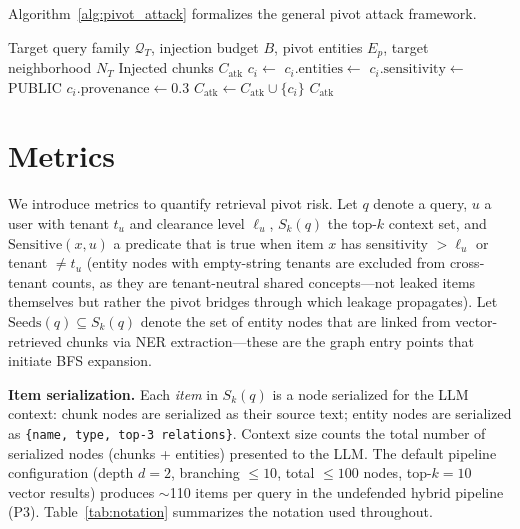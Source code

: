 \documentclass[letterpaper,twocolumn,10pt]{article}
\begin{document}
\medskip

Algorithm~\ref{alg:pivot_attack} formalizes the general pivot attack
framework.

\begin{algorithm}[t]
\caption{General Retrieval Pivot Attack}
\label{alg:pivot_attack}
\begin{algorithmic}[1]
\Require Target query family $\mathcal{Q}_T$, injection budget $B$,
  pivot entities $E_p$, target neighborhood $N_T$
\Ensure Injected chunks $C_\text{atk}$
  \State $c_i \leftarrow$ 
  \State $c_i.\text{entities} \leftarrow$ 
  \State $c_i.\text{sensitivity} \leftarrow$ PUBLIC
  \State $c_i.\text{provenance} \leftarrow 0.3$
  \State $C_\text{atk} \leftarrow C_\text{atk} \cup \{c_i\}$
\EndFor
\State {}
\State \Return $C_\text{atk}$
\end{algorithmic}
\end{algorithm}

\section{Metrics}
\label{sec:metrics}

We introduce metrics to quantify retrieval pivot risk. Let $q$
denote a query, $u$ a user with tenant $t_u$ and clearance level
$\ell_u$, $S_k(q)$ the top-$k$ context set, and
$\text{Sensitive}(x, u)$ a predicate that is true when item $x$ has
sensitivity $> \ell_u$ or tenant $\neq t_u$ (entity nodes with
empty-string tenants are excluded from cross-tenant counts, as they
are tenant-neutral shared concepts---not leaked items themselves but
rather the pivot bridges through which leakage propagates). Let
$\text{Seeds}(q) \subseteq S_k(q)$ denote the set of entity nodes
that are linked from vector-retrieved chunks via NER extraction---these
are the graph entry points that initiate BFS expansion.

\textbf{Item serialization.} Each \emph{item} in $S_k(q)$ is a node
serialized for the LLM context: chunk nodes are serialized as their
source text; entity nodes are serialized as
\texttt{\{name, type, top-3 relations\}}. Context size counts the
total number of serialized nodes (chunks + entities) presented to
the LLM. The default pipeline configuration (depth $d=2$, branching
$\leq 10$, total $\leq 100$ nodes, top-$k{=}10$ vector results)
produces ${\sim}$110 items per query in the undefended hybrid
pipeline (P3). Table~\ref{tab:notation} summarizes the notation used
throughout.
\end{document}
